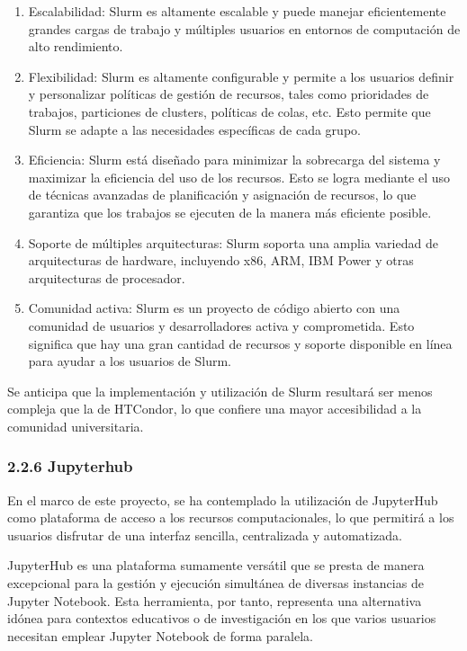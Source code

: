 \begin{doublespace}
\begin{multicols}{2}
    \begin{enumerate}
      \item Escalabilidad: Slurm es altamente escalable y puede manejar eficientemente grandes cargas de trabajo y múltiples usuarios en entornos de computación de alto rendimiento.
      \item Flexibilidad: Slurm es altamente configurable y permite a los usuarios definir y personalizar políticas de gestión de recursos, tales como prioridades de trabajos, particiones de clusters, políticas de colas, etc. Esto permite que Slurm se adapte a las necesidades específicas de cada grupo.
      \item Eficiencia: Slurm está diseñado para minimizar la sobrecarga del sistema y maximizar la eficiencia del uso de los recursos. Esto se logra mediante el uso de técnicas avanzadas de planificación y asignación de recursos, lo que garantiza que los trabajos se ejecuten de la manera más eficiente posible.
      \item Soporte de múltiples arquitecturas: Slurm soporta una amplia variedad de arquitecturas de hardware, incluyendo x86, ARM, IBM Power y otras arquitecturas de procesador.
      \item Comunidad activa: Slurm es un proyecto de código abierto con una comunidad de usuarios y desarrolladores activa y comprometida. Esto significa que hay una gran cantidad de recursos y soporte disponible en línea para ayudar a los usuarios de Slurm.
    \end{enumerate}

    Se anticipa que la implementación y utilización de Slurm resultará ser menos compleja que la de HTCondor, lo que confiere una mayor accesibilidad a la comunidad universitaria. \cite{RHEL-SLURM-1}

    \subsubsection{2.2.6 Jupyterhub}

    En el marco de este proyecto, se ha contemplado la utilización de JupyterHub como plataforma de acceso a los recursos computacionales, lo que permitirá a los usuarios disfrutar de una interfaz sencilla, centralizada y automatizada.

    JupyterHub es una plataforma sumamente versátil que se presta de manera excepcional para la gestión y ejecución simultánea de diversas instancias de Jupyter Notebook. Esta herramienta, por tanto, representa una alternativa idónea para contextos educativos o de investigación en los que varios usuarios necesitan emplear Jupyter Notebook de forma paralela.


\end{multicols}
\end{doublespace}
